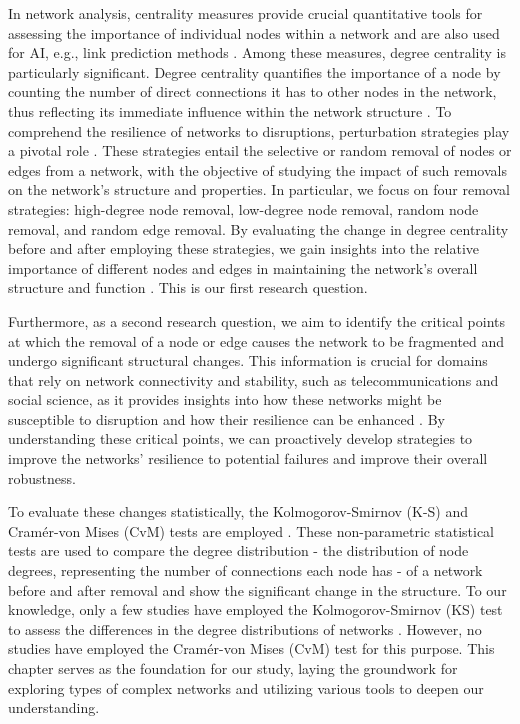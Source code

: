 \documentclass[conference]{IEEEtran} %
\begin{document}
In network analysis, centrality measures provide crucial quantitative tools for assessing the importance of individual nodes within a network \cite{borgatti2005centrality, newman2010networks,dorpinghaus2022context,dorpinghaus2023towards} and are also used for AI, e.g., link prediction methods \cite{dorpinghaus2022novel,dahhani2023graph}. Among these measures, degree centrality is particularly significant. Degree centrality quantifies the importance of a node by counting the number of direct connections it has to other nodes in the network, thus reflecting its immediate influence within the network structure \cite{freeman1978centrality}. To comprehend the resilience of networks to disruptions, perturbation strategies play a pivotal role \cite{albert2000error, newman2010networks}. These strategies entail the selective or random removal of nodes or edges from a network, with the objective of studying the impact of such removals on the network's structure and properties. In particular, we focus on four removal strategies: high-degree node removal, low-degree node removal, random node removal, and random edge removal. By evaluating the change in degree centrality before and after employing these strategies, we gain insights into the relative importance of different nodes and edges in maintaining the network's overall structure and function \cite{newman2010networks, borgatti2005centrality}. This is our first research question. 

Furthermore, as a second research question, we aim to identify the critical points at which the removal of a node or edge causes the network to be fragmented and undergo significant structural changes. This information is crucial for domains that rely on network connectivity and stability, such as telecommunications and social science, as it provides insights into how these networks might be susceptible to disruption and how their resilience can be enhanced \cite{albert2000error, newman2010networks}. By understanding these critical points, we can proactively develop strategies to improve the networks' resilience to potential failures and improve their overall robustness.

To evaluate these changes statistically, the Kolmogorov-Smirnov (K-S) and Cramér-von Mises (CvM) tests are employed \cite{broido2019scale, arnold2011nonparametric}. These non-parametric statistical tests are used to compare the degree distribution - the distribution of node degrees, representing the number of connections each node has - of a network before and after removal and show the significant change in the structure. To our knowledge, only a few studies have employed the Kolmogorov-Smirnov (KS) test to assess the differences in the degree distributions of networks \cite{clauset2009power, broido2019scale}. However, no studies have employed the Cramér-von Mises (CvM) test for this purpose. This chapter serves as the foundation for our study, laying the groundwork for exploring types of complex networks and utilizing various tools to deepen our understanding.
\end{document}
